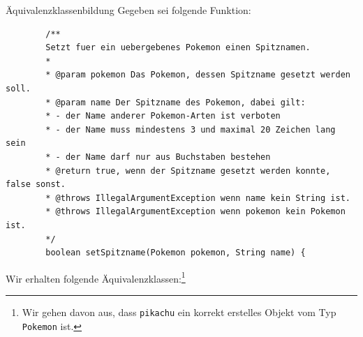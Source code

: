 \begin{example}{Äquivalenzklassenbildung}
    Gegeben sei folgende Funktion:
    \begin{lstlisting}
        /**
        Setzt fuer ein uebergebenes Pokemon einen Spitznamen.
        *
        * @param pokemon Das Pokemon, dessen Spitzname gesetzt werden soll.
        * @param name Der Spitzname des Pokemon, dabei gilt:
        * - der Name anderer Pokemon-Arten ist verboten
        * - der Name muss mindestens 3 und maximal 20 Zeichen lang sein
        * - der Name darf nur aus Buchstaben bestehen
        * @return true, wenn der Spitzname gesetzt werden konnte, false sonst.
        * @throws IllegalArgumentException wenn name kein String ist.
        * @throws IllegalArgumentException wenn pokemon kein Pokemon ist.
        */
        boolean setSpitzname(Pokemon pokemon, String name) {
    \end{lstlisting}

    Wir erhalten folgende Äquivalenzklassen:\footnote{Wir gehen davon aus, dass \texttt{pikachu} ein korrekt erstelles Objekt vom Typ \texttt{Pokemon} ist.}


\end{example}
